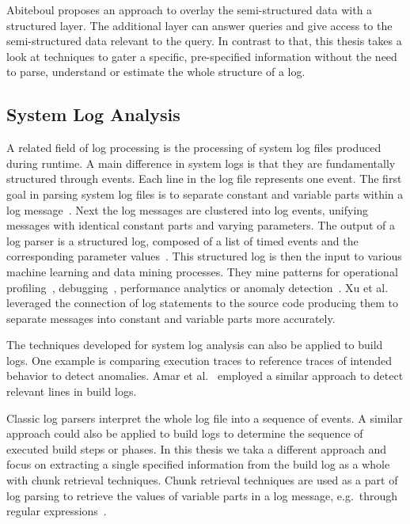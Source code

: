 \documentclass[\myrootdir/main.tex]{subfiles}
\begin{document}
Abiteboul proposes an approach to overlay the semi-structured data with a structured layer.
The additional layer can answer queries and give access to the semi-structured data relevant to the query.
In contrast to that, this thesis takes a look at techniques to gater a specific, pre-specified information without the need to parse, understand or estimate the whole structure of a log.

\subsection{System Log Analysis}
\label{sec:log-analysis}
A related field of log processing is the processing of system log files produced during runtime.
A main difference in system logs is that they are fundamentally structured through events.
Each line in the log file represents one event.
The first goal in parsing system log files is to separate constant and variable parts within a log message~\cite{nagappan2010abstracting,he2017towards}.
Next the log messages are clustered into log events, unifying messages with identical constant parts and varying parameters.
The output of a log parser is a structured log, composed of a list of timed events and the corresponding parameter values~\cite{he2016evaluation}.
This structured log is then the input to various machine learning and data mining processes.
They mine patterns for operational profiling~\cite{nagappan2009efficiently}, debugging~\cite{oliner2012advances}, performance analytics or anomaly detection~\cite{nagappan2010abstracting}.
Xu et al.~\cite{xu2009detecting} leveraged the connection of log statements to the source code producing them to separate messages into constant and variable parts more accurately.

The techniques developed for system log analysis can also be applied to build logs.
One example is comparing execution traces to reference traces of intended behavior to detect anomalies.
Amar et al.~\cite{amar2019mining} employed a similar approach to detect relevant lines in build logs.

Classic log parsers interpret the whole log file into a sequence of events.
A similar approach could also be applied to build logs to determine the sequence of executed build steps or phases.
In this thesis we taka a different approach and focus on extracting a single specified information from the build log as a whole with chunk retrieval techniques.
Chunk retrieval techniques are used as a part of log parsing to retrieve the values of variable parts in a log message, e.g.\ through regular expressions~\cite{nagappan2010abstracting,xu2009detecting}.
\end{document}
